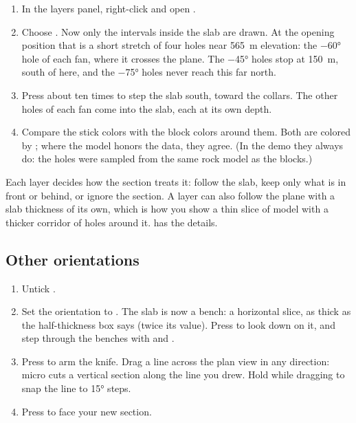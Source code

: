\begin{tryit}
\begin{enumerate}
\item In the layers panel, right-click  and open .
\item Choose . Now only the intervals inside the slab are drawn. At the opening position that is a short stretch of four holes near 565~m elevation: the −60° hole of each fan, where it crosses the plane. The −45° holes stop at 150~m, south of here, and the −75° holes never reach this far north.
\item Press \key{,} about ten times to step the slab south, toward the collars. The other holes of each fan come into the slab, each at its own depth.
\item Compare the stick colors with the block colors around them. Both are colored by ; where the model honors the data, they agree. (In the demo they always do: the holes were sampled from the same rock model as the blocks.)
\end{enumerate}
\end{tryit}

Each layer decides how the section treats it: follow the slab, keep only what is in front or behind, or ignore the section. A layer can also follow the plane with a slab thickness of its own, which is how you show a thin slice of model with a thicker corridor of holes around it.  has the details.

\subsection{Other orientations}
\begin{tryit}
\begin{enumerate}
\item Untick .
\item Set the orientation to . The slab is now a bench: a horizontal slice, as thick as the half-thickness box says (twice its value). Press  to look down on it, and step through the benches with  and \key{,}.
\item Press  to arm the knife. Drag a line across the plan view in any direction: micro cuts a vertical section along the line you drew. Hold  while dragging to snap the line to 15° steps.
\item Press  to face your new section.
\end{enumerate}
\end{tryit}

